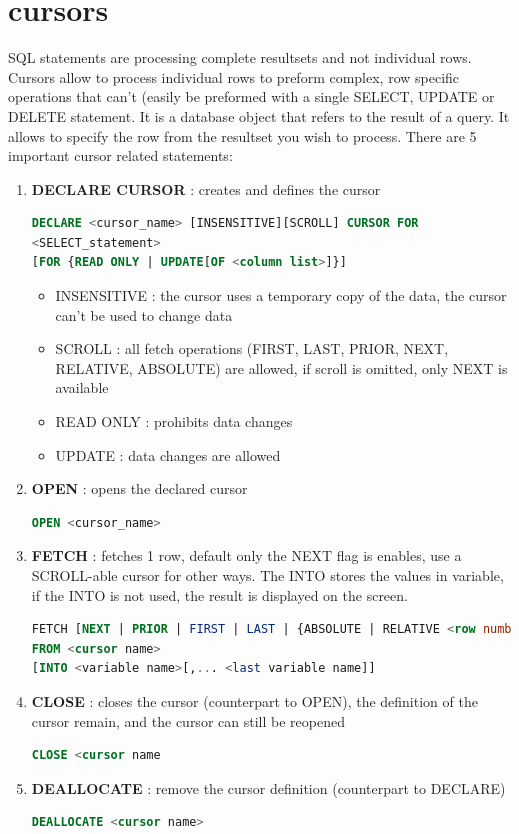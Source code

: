\documentclass{report}
\begin{document}
	 \section{cursors}
	 SQL statements are processing complete resultsets and not individual rows. Cursors allow to process individual rows to preform complex, row specific operations that can't (easily be preformed with a single SELECT, UPDATE or DELETE statement. It is a database object that refers to the result of a query. It allows to specify the row from the resultset you wish to process.
	There are 5 important cursor related statements: 
	\begin{enumerate}
		\item \textbf{DECLARE CURSOR} : creates and defines the cursor
		\begin{lstlisting}[language = sql]
DECLARE <cursor_name> [INSENSITIVE][SCROLL] CURSOR FOR
<SELECT_statement> 
[FOR {READ ONLY | UPDATE[OF <column list>]}]\end{lstlisting}
		\begin{itemize}
			\item INSENSITIVE : the cursor uses a temporary copy of the data, the cursor can't be used to change data 
			\item SCROLL : all fetch operations (FIRST, LAST, PRIOR, NEXT, RELATIVE, ABSOLUTE) are allowed, if scroll is omitted, only NEXT is available
			\item READ ONLY : prohibits data changes 
			\item UPDATE : data changes are allowed
		\end{itemize}
		\item \textbf{OPEN} : opens the declared cursor
		\begin{lstlisting}[language = sql]
OPEN <cursor_name>\end{lstlisting}
		\item \textbf{FETCH} : fetches 1 row, default only the NEXT flag is enables, use a SCROLL-able cursor for other ways. The INTO stores the values in variable, if the INTO is not used, the result is displayed on the screen.
		\begin{lstlisting}[language = sql]
FETCH [NEXT | PRIOR | FIRST | LAST | {ABSOLUTE | RELATIVE <row number>}]
FROM <cursor name>
[INTO <variable name>[,... <last variable name]]	\end{lstlisting}
		\item \textbf{CLOSE} : closes the cursor (counterpart to OPEN), the definition of the cursor remain, and the cursor can still be reopened
		\begin{lstlisting}[language = sql]
CLOSE <cursor name	\end{lstlisting}		
		\item \textbf{DEALLOCATE} : remove the cursor definition (counterpart to DECLARE)
		\begin{lstlisting}[language = sql]
DEALLOCATE <cursor name> \end{lstlisting}		
	\end{enumerate}
\end{document}
